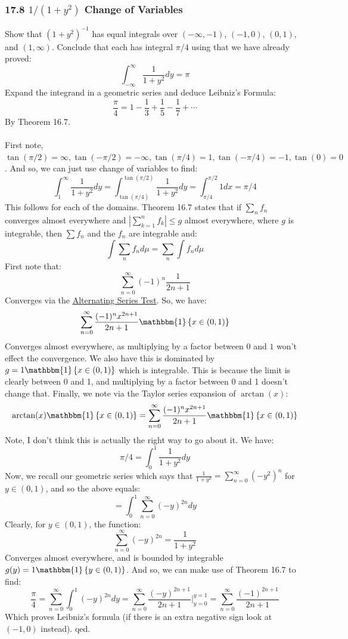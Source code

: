 \documentclass[12pt,a4paper]{article}
\newcommand{\1}[1]{\mathbbm{1}\left\{ #1 \right\}}
\begin{document}
\subsubsection{17.8 $1/(1+y^2)$ Change of Variables} Show that $(1 + y^2)^{-1}$ has equal integrals over $(-\infty,-1)$, $(-1,0)$, $(0,1)$, and $(1,\infty)$. Conclude that each has integral $\pi/4$ using that we have already proved:
$$
	\int_{-\infty}^\infty \frac{1}{1 + y^2} dy = \pi
$$
Expand the integrand in a geometric series and deduce Leibniz's Formula:
$$
	\frac{\pi}{4} = 1 - \frac{1}{3} + \frac{1}{5} - \frac{1}{7} + \cdots
$$
By Theorem 16.7.
\\\\
First note, $\tan(\pi/2) = \infty, \tan(-\pi/2) = -\infty, \tan(\pi/4) = 1, \tan(-\pi/4) = -1, \tan(0) = 0$. And so, we can just use change of variables to find:
$$
	\int_1^{\infty} \frac{1}{1 + y^2} dy = 
	\int_{\tan(\pi/4)}^{\tan(\pi/2)} \frac{1}{1 + y^2} dy =
	\int_{\pi/4}^{\pi/2} 1 dx = \pi/4
$$
This follows for each of the domains. Theorem 16.7 states that if $\sum_n f_n$ converges almost everywhere and $\left|\sum_{k=1}^n f_k\right| \leq g$ almost everywhere, where $g$ is integrable, then $\sum f_n$ and the $f_n$ are integrable and:
$$
	\int \sum_n f_n d\mu = \sum_n \int f_n d\mu
$$
First note that:
$$
	\sum_{n=0}^\infty (-1)^n \frac{1}{2n + 1}
$$
Converges via the \href{https://en.wikipedia.org/wiki/Alternating_series_test}{Alternating Series Test}. So, we have:
$$
	\sum_{n=0}^\infty \frac{(-1)^nx^{2n + 1}}{2n + 1}\1{x \in (0,1)}
$$
Converges almost everywhere, as multiplying by a factor between $0$ and $1$ won't effect the convergence. We also have this is dominated by $g = 1\1{x \in (0,1)}$ which is integrable. This is because the limit is clearly between 0 and 1, and multiplying by a factor between 0 and 1 doesn't change that. Finally, we note via the Taylor series expansion of $\arctan(x)$:
$$
	\arctan(x)\1{x \in (0,1)} = 
	\sum_{n=0}^\infty \frac{(-1)^nx^{2n + 1}}{2n + 1}\1{x \in (0,1)}
$$
Note, I don't think this is actually the right way to go about it. We have:
$$
	\pi/4 = \int_0^1 \frac{1}{1 + y^2} dy
$$
Now, we recall our geometric series which says that $\frac{1}{1 + y^2} = \sum_{n=0}^\infty (-y^2)^n$ for $y \in (0,1)$, and so the above equals:
$$
	= \int_0^1 \sum_{n=0}^\infty (-y)^{2n} dy
$$
Clearly, for $y \in (0,1)$, the function:
$$
	\sum_{n=0}^\infty (-y)^{2n} = \frac{1}{1 + y^2}
$$
Converges almost everywhere, and is bounded by integrable $g(y) = 1\1{y \in (0,1)}$. And so, we can make use of Theorem 16.7 to find:
$$
	\frac{\pi}{4} =
	\sum_{n=0}^\infty \int_0^1 (-y)^{2n} dy =
	\sum_{n=0}^\infty \frac{(-y)^{2n+1}}{2n + 1}\bigg|_{y=0}^{y=1} =
	\sum_{n=0}^\infty \frac{(-1)^{2n+1}}{2n + 1}
$$
Which proves Leibniz's formula (if there is an extra negative sign look at $(-1,0)$ instead). qed.
\end{document}
